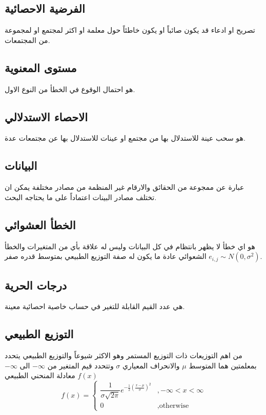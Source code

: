 \subsection{الفرضية الاحصائية}
تصريح او ادعاء قد يكون صائباً او يكون خاطئاً حول معلمة او اكثر لمجتمع او لمجموعة من المجتمعات.

\subsection{مستوى المعنوية}
هو احتمال الوقوع في الخطأ من النوع الاول.

\subsection{الاحصاء الاستدلالي}
هو سحب عينة للاستدلال بها من مجتمع او عينات للاستدلال بها عن مجتمعات عدة.

\subsection{البيانات}
عبارة عن ممجوعة من الحقائق والارقام غير المنظمة من مصادر مختلفة يمكن ان تختلف مصادر البينات اعتماداً على ما يحتاجه البحث.

\subsection{الخطأ العشوائي }
هو اي خطأ لا يظهر بانتظام في كل البيانات وليس له علاقة بأي من المتغيرات والخطأ الشعوائي عادة ما يكون له صفة التوزيع الطبيعي بمتوسط قدره صفر $e_{i,j} \sim N(0, \sigma^2)$.

\subsection{درجات الحرية}
هي عدد القيم القابلة للتغير في حساب خاصية احصائية معينة.

\subsection{التوزيع الطبيعي}
من اهم التوزيعات ذات التوزيع المستمر وهو الاكثر شيوعاً والتوزيع الطبيعي يتحدد بمعلمتين هما المتوسط $\mu$ والانحراف المعياري $\sigma$ وتتحدد قيم  المتغير من $-\infty$ الى $-\infty$ معادلة المنحني الطبيعي $f(x)$ 
\[
f(x) = 
\begin{cases}
	\dfrac{1}{\sigma\sqrt{2\pi}} e^{-\frac{1}{2}\left(\frac{x-\mu}{\sigma}\right)^2} & ,-\infty < x < \infty \\[5pt]
	0 & , \text{otherwise}
\end{cases}
\]

